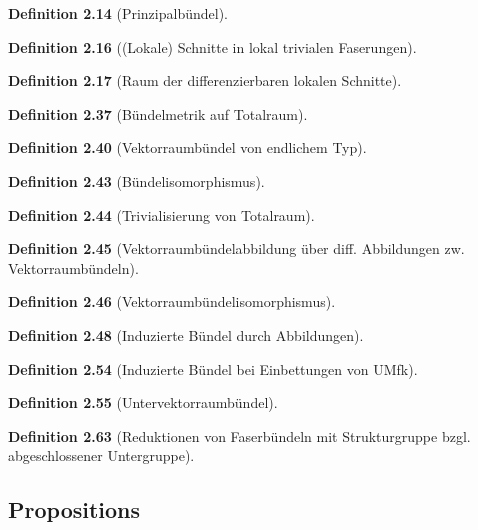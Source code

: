 \documentclass[10pt, letterpaper]{article}
\newcommand{\CustomHeading}[3]{%
  \par\medskip\noindent%
  \textbf{#1 #2} \textnormal{(#3)}.\enskip%
}
\newenvironment{DEF}[2]{\CustomHeading{Definition}{#1}{#2}}{}
\begin{document}
\begin{DEF}{2.14}{Prinzipalbündel}

\end{DEF}


\begin{DEF}{2.16}{(Lokale) Schnitte in lokal trivialen Faserungen}

\end{DEF}


\begin{DEF}{2.17}{Raum der differenzierbaren lokalen Schnitte}

\end{DEF}


\begin{DEF}{2.37}{Bündelmetrik auf Totalraum}

\end{DEF}


\begin{DEF}{2.40}{Vektorraumbündel von endlichem Typ}

\end{DEF}


\begin{DEF}{2.43}{Bündelisomorphismus}

\end{DEF}


\begin{DEF}{2.44}{Trivialisierung von Totalraum}

\end{DEF}


\begin{DEF}{2.45}{Vektorraumbündelabbildung über diff. Abbildungen zw. Vektorraumbündeln}

\end{DEF}


\begin{DEF}{2.46}{Vektorraumbündelisomorphismus}

\end{DEF}


\begin{DEF}{2.48}{Induzierte Bündel durch Abbildungen}

\end{DEF}


\begin{DEF}{2.54}{Induzierte Bündel bei Einbettungen von UMfk}

\end{DEF}


\begin{DEF}{2.55}{Untervektorraumbündel}

\end{DEF}


\begin{DEF}{2.63}{Reduktionen von Faserbündeln mit Strukturgruppe bzgl. abgeschlossener Untergruppe}

\end{DEF}



\subsection{Propositions}






\pagebreak


\printbibliography
\end{document}
